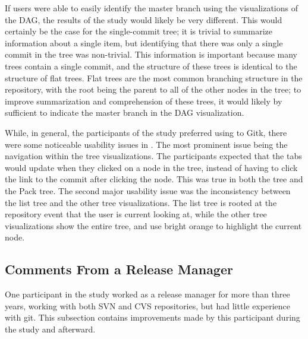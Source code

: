 If users were able to easily identify the master branch using the
visualizations of the DAG, the results of the study would likely be very
different. This would
certainly be the case for the single-commit tree; 
it is trivial to summarize information about a single item, but
identifying that there was only a single commit in the tree was
non-trivial. This information is important because many trees contain a
single commit, and the structure of these trees is identical to the
structure of flat trees. Flat trees are the most common branching
structure in the repository, with the root being the parent to all of
the other nodes in the tree; to improve summarization and comprehension
of these trees, it would likely by sufficient to indicate the master
branch in the DAG visualization.

While, in general, the participants of the study preferred using \tool
to Gitk, there were some noticeable usability issues in \tool. The most
prominent issue being the navigation within the tree visualizations. The
participants expected that the tabs would update when they clicked on a
node in the tree, instead of having to click the link to the commit
after clicking the node. This was true in both the \rt tree and the Pack
tree. The second major usability issue was the inconsistency between the
list tree and the other tree visualizations. The list tree is rooted at
the repository event that the user is current looking at, while the
other tree visualizations show the entire tree, and use bright orange to
highlight the current node.


\subsection{Comments From a Release Manager}
\label{sub:comments_from_a_release_manager}

One participant in the study worked as a release manager for more than
three years, working with both SVN and CVS repositories, but had little
experience with git. This subsection contains improvements made by this
participant during the study and afterward.

